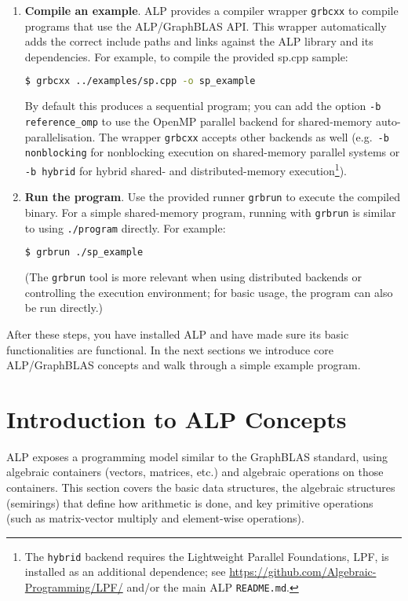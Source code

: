 \begin{enumerate}
\item \textbf{Compile an example}. ALP provides a compiler wrapper \texttt{grbcxx} to compile programs that use the ALP/GraphBLAS API. This wrapper automatically adds the correct include paths and links against the ALP library and its dependencies. For example, to compile the provided sp.cpp sample:
\begin{lstlisting}[language=bash]
$ grbcxx ../examples/sp.cpp -o sp_example
\end{lstlisting}
By default this produces a sequential program; you can add the option \texttt{-b reference\_omp} to use the OpenMP parallel backend for shared-memory auto-parallelisation. The wrapper \texttt{grbcxx} accepts other backends as well (e.g.\ \texttt{-b nonblocking} for nonblocking execution on shared-memory parallel systems or \texttt{-b hybrid} for hybrid shared- and distributed-memory execution\footnote{The \texttt{hybrid} backend requires the Lightweight Parallel Foundations, LPF, is installed as an additional dependence; see \url{https://github.com/Algebraic-Programming/LPF/} and/or the main ALP \texttt{README.md}.}).

\item \textbf{Run the program}. Use the provided runner \texttt{grbrun} to execute the compiled binary. For a simple shared-memory program, running with \texttt{grbrun} is similar to using \texttt{./program} directly. For example:
\begin{lstlisting}[language=bash]
$ grbrun ./sp_example
\end{lstlisting}
(The \texttt{grbrun} tool is more relevant when using distributed backends or controlling the execution environment; for basic usage, the program can also be run directly.)
\end{enumerate}
After these steps, you have installed ALP and have made sure its basic functionalities are functional. In the next sections we introduce core ALP/GraphBLAS concepts and walk through a simple example program.

\section{Introduction to ALP Concepts}\label{sec:alp_concepts}

ALP exposes a programming model similar to the GraphBLAS standard, using algebraic containers (vectors, matrices, etc.) and algebraic operations on those containers. This section covers the basic data structures, the algebraic structures (semirings) that define how arithmetic is done, and key primitive operations (such as matrix-vector multiply and element-wise operations).

